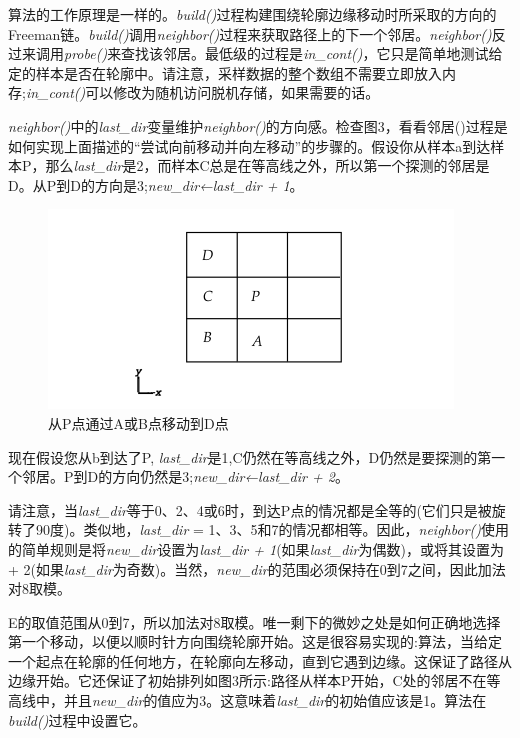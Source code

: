 \begin{CJK}{UTF8}{gbsn}
算法的工作原理是一样的。\textit{build()}过程构建围绕轮廓边缘移动时所采取的方向的Freeman链。\textit{build()}调用\textit{neighbor()}过程来获取路径上的下一个邻居。\textit{neighbor()}反过来调用\textit{probe()}来查找该邻居。最低级的过程是\textit{in\_cont()}，它只是简单地测试给定的样本是否在轮廓中。请注意，采样数据的整个数组不需要立即放入内存;\textit{in\_cont()}可以修改为随机访问脱机存储，如果需要的话。

\textit{neighbor()}中的\textit{last\_dir}变量维护\textit{neighbor()}的方向感。检查图3，看看邻居()过程是如何实现上面描述的“尝试向前移动并向左移动”的步骤的。假设你从样本a到达样本P，那么\textit{last\_dir}是2，而样本C总是在等高线之外，所以第一个探测的邻居是D。从P到D的方向是3;\textit{new\_dir←last\_dir + 1}。

\begin{figure}[htbp]%
  \centering
  \includegraphics[totalheight=1.5in]{./fig/1.6.3.png}
  \caption{从P点通过A或B点移动到D点} 
  \label{fig:1.6.3}
\end{figure}

现在假设您从b到达了P, \textit{last\_dir}是1,C仍然在等高线之外，D仍然是要探测的第一个邻居。P到D的方向仍然是3;\textit{new\_dir←last\_dir + 2}。

请注意，当\textit{last\_dir}等于0、2、4或6时，到达P点的情况都是全等的(它们只是被旋转了90度)。类似地，\textit{last\_dir} = 1、3、5和7的情况都相等。因此，\textit{neighbor()}使用的简单规则是将\textit{new\_dir}设置为\textit{last\_dir + 1}(如果\textit{last\_dir}为偶数)，或将其设置为+ 2(如果\textit{last\_dir}为奇数)。当然，\textit{new\_dir}的范围必须保持在0到7之间，因此加法对8取模。

E的取值范围从0到7，所以加法对8取模。唯一剩下的微妙之处是如何正确地选择第一个移动，以便以顺时针方向围绕轮廓开始。这是很容易实现的:算法，当给定一个起点在轮廓的任何地方，在轮廓向左移动，直到它遇到边缘。这保证了路径从边缘开始。它还保证了初始排列如图3所示:路径从样本P开始，C处的邻居不在等高线中，并且\textit{new\_dir}的值应为3。这意味着\textit{last\_dir}的初始值应该是1。算法在\textit{build()}过程中设置它。


\end{CJK}
